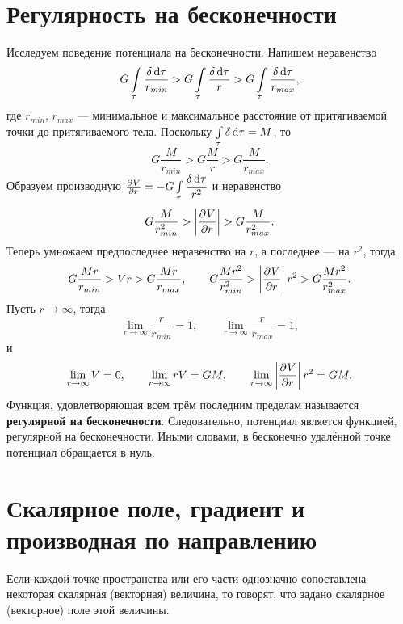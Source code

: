 \documentclass[11pt, a4paper]{article}
\theoremstyle{plain}
\theoremstyle{definition}
\theoremstyle{remark}
\begin{document}
\section{Регулярность на бесконечности}
Исследуем поведение потенциала на бесконечности. Напишем неравенство
\begin{equation*}
    G\int\limits_\tau\dfrac{\delta\dif\tau}{r_{min}} >
    G\int\limits_\tau\dfrac{\delta\dif\tau}{r} >
    G\int\limits_\tau\dfrac{\delta\dif\tau}{r_{max}},
\end{equation*}
где $r_{min}$, $r_{max}$ --- минимальное и максимальное расстояние от притягиваемой точки до
притягиваемого тела. Поскольку $\int\limits_\tau\delta\dif\tau = M$, то
\begin{equation*}
    G\dfrac{M}{r_{min}} >
    G\dfrac{M}{r} >
    G\dfrac{M}{r_{max}}.
\end{equation*}
Образуем производную $\pd{V}{r} = -G\int\limits_\tau\dfrac{\delta\dif\tau}{r^2}$ и неравенство
\begin{equation*}
    G\dfrac{M}{r^2_{min}} >
     \left|\dpd{V}{r}\right| >
    G\dfrac{M}{r^2_{max}}.
\end{equation*}
Теперь умножаем предпоследнее неравенство на $r$, а последнее --- на $r^2$, тогда
\begin{equation*}
    G\dfrac{Mr}{r_{min}} >
    Vr >
    G\dfrac{Mr}{r_{max}}, \qquad
    G\dfrac{Mr^2}{r^2_{min}} >
     \left|\dpd{V}{r}\right| r^2 >
    G\dfrac{M r^2}{r^2_{max}}.
\end{equation*}
Пусть $r\to\infty$, тогда
\begin{equation*}
    \lim\limits_{r\to\infty}\dfrac{r}{r_{min}} = 1,\qquad 
    \lim\limits_{r\to\infty}\dfrac{r}{r_{max}} = 1,
\end{equation*}
и
\begin{equation*}
    \lim\limits_{r\to\infty} V = 0,\qquad 
    \lim\limits_{r\to\infty} rV = GM,\qquad
    \lim\limits_{r\to\infty} \left|\dpd{V}{r}\right| r^2 = GM.
\end{equation*}
Функция, удовлетворяющая всем трём последним пределам называется \textbf{регулярной на
бесконечности}. Следовательно, потенциал является функцией, регулярной на бесконечности. Иными словами, в бесконечно удалённой точке потенциал обращается в нуль.

\section{Скалярное поле, градиент и производная по направлению}
Если каждой точке пространства или его части однозначно сопоставлена некоторая скалярная (векторная) величина, то говорят, что задано скалярное (векторное) поле этой величины. 
\end{document}
